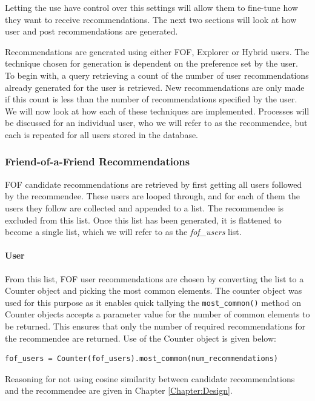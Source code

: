\noindent Letting the use have control over this settings will allow them to fine-tune how they want to receive recommendations. The next two sections will look at how user and post recommendations are generated.

Recommendations are generated using either FOF, Explorer or Hybrid users. The technique chosen for generation is dependent on the preference set by the user. To begin with, a query retrieving a count of the number of user recommendations already generated for the user is retrieved. New recommendations are only made if this count is less than the number of recommendations specified by the user. We will now look at how each of these techniques are implemented. Processes will be discussed for an individual user, who we will refer to as the recommendee, but each is repeated for all users stored in the database.

\subsubsection{Friend-of-a-Friend Recommendations}
FOF candidate recommendations are retrieved by first getting all users followed by the recommendee. These users are looped through, and for each of them the users they follow are collected and appended to a list. The recommendee is excluded from this list. Once this list has been generated, it is flattened to become a single list, which we will refer to as the \textit{fof\_users} list.

\paragraph{User} From this list, FOF user recommendations are chosen by converting the list to a Counter object and picking the most common elements. The counter object was used for this purpose as it enables quick tallying \cite{Python:Counter} the \texttt{most\_common()} method on Counter objects accepts a parameter value for the number of common elements to be returned. This ensures that only the number of required recommendations for the recommendee are returned. Use of the Counter object is given below:

\begin{lstlisting}[language=python]
	fof_users = Counter(fof_users).most_common(num_recommendations)
\end{lstlisting}

Reasoning for not using cosine similarity between candidate recommendations and the recommendee are given in Chapter \ref{Chapter:Design}.

